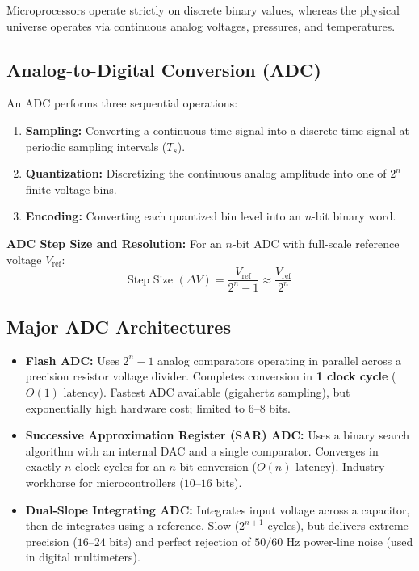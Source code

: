 Microprocessors operate strictly on discrete binary values, whereas the physical universe operates via continuous analog voltages, pressures, and temperatures.

\subsection{Analog-to-Digital Conversion (ADC)}
An ADC performs three sequential operations:
\begin{enumerate}[label=\bfseries\arabic*.]
    \item \textbf{Sampling:} Converting a continuous-time signal into a discrete-time signal at periodic sampling intervals ($T_s$).
    \item \textbf{Quantization:} Discretizing the continuous analog amplitude into one of $2^n$ finite voltage bins.
    \item \textbf{Encoding:} Converting each quantized bin level into an $n$-bit binary word.
\end{enumerate}

\textbf{ADC Step Size and Resolution:}
For an $n$-bit ADC with full-scale reference voltage $V_{\text{ref}}$:
\begin{equation}
\label{eq:adc_step_size}
\boxed{\text{Step Size } (\Delta V) = \frac{V_{\text{ref}}}{2^n - 1} \approx \frac{V_{\text{ref}}}{2^n}}
\end{equation}

\subsection{Major ADC Architectures}
\begin{itemize}
    \item \textbf{Flash ADC:} Uses $2^n - 1$ analog comparators operating in parallel across a precision resistor voltage divider. Completes conversion in \textbf{1 clock cycle} ($O(1)$ latency). Fastest ADC available (gigahertz sampling), but exponentially high hardware cost; limited to $6$--$8$ bits.
    \item \textbf{Successive Approximation Register (SAR) ADC:} Uses a binary search algorithm with an internal DAC and a single comparator. Converges in exactly $n$ clock cycles for an $n$-bit conversion ($O(n)$ latency). Industry workhorse for microcontrollers ($10$--$16$ bits).
    \item \textbf{Dual-Slope Integrating ADC:} Integrates input voltage across a capacitor, then de-integrates using a reference. Slow ($2^{n+1}$ cycles), but delivers extreme precision ($16$--$24$ bits) and perfect rejection of $50/60\text{ Hz}$ power-line noise (used in digital multimeters).
\end{itemize}

